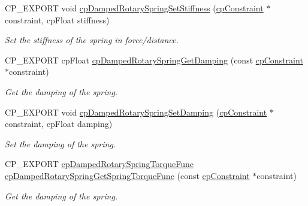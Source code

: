 \begin{DoxyCompactItemize}
C\+P\+\_\+\+E\+X\+P\+O\+RT void \hyperlink{group__cpDampedRotarySpring_ga2da549aff945710a181b704b3a57a6f3}{cp\+Damped\+Rotary\+Spring\+Set\+Stiffness} (\hyperlink{structcpConstraint}{cp\+Constraint} $\ast$constraint, cp\+Float stiffness)
\begin{DoxyCompactList}\small\item\em Set the stiffness of the spring in force/distance. \end{DoxyCompactList}\item 
\mbox{\label{group__cpDampedRotarySpring_gaaee99f98580f2b93abb35b5b386e176f}} 
C\+P\+\_\+\+E\+X\+P\+O\+RT cp\+Float \hyperlink{group__cpDampedRotarySpring_gaaee99f98580f2b93abb35b5b386e176f}{cp\+Damped\+Rotary\+Spring\+Get\+Damping} (const \hyperlink{structcpConstraint}{cp\+Constraint} $\ast$constraint)
\begin{DoxyCompactList}\small\item\em Get the damping of the spring. \end{DoxyCompactList}\item 
\mbox{\label{group__cpDampedRotarySpring_gacebcb68e260afa9d2e1739acfdadea1d}} 
C\+P\+\_\+\+E\+X\+P\+O\+RT void \hyperlink{group__cpDampedRotarySpring_gacebcb68e260afa9d2e1739acfdadea1d}{cp\+Damped\+Rotary\+Spring\+Set\+Damping} (\hyperlink{structcpConstraint}{cp\+Constraint} $\ast$constraint, cp\+Float damping)
\begin{DoxyCompactList}\small\item\em Set the damping of the spring. \end{DoxyCompactList}\item 
\mbox{\label{group__cpDampedRotarySpring_ga95cce882935976957ee262590b5a1bbc}} 
C\+P\+\_\+\+E\+X\+P\+O\+RT \hyperlink{group__cpDampedRotarySpring_ga072c236959020fab4f30087b5234040b}{cp\+Damped\+Rotary\+Spring\+Torque\+Func} \hyperlink{group__cpDampedRotarySpring_ga95cce882935976957ee262590b5a1bbc}{cp\+Damped\+Rotary\+Spring\+Get\+Spring\+Torque\+Func} (const \hyperlink{structcpConstraint}{cp\+Constraint} $\ast$constraint)
\begin{DoxyCompactList}\small\item\em Get the damping of the spring. \end{DoxyCompactList}\item 
\mbox{\label{group__cpDampedRotarySpring_ga79b061501fb25d4163a301330e10bb26}} 

\end{DoxyCompactItemize}
